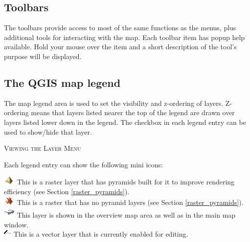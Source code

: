 \subsection{Toolbars}
The toolbars provide access to most of the same functions as the menus, plus
additional tools for interacting with the map. Each toolbar item has popup
help available. Hold your mouse over the item and a short description of the
tool's purpose will be displayed. %

\subsection{The QGIS map legend}
The map legend area is used to set the visibility and z-ordering of layers.
Z-ordering means that layers listed nearer the top of the legend are drawn
over layers listed lower down in the legend. The checkbox in each legend entry
can be used to show/hide that layer.
\begin{Tip} \caption{\textsc{Viewing the Layer Menu}}
\end{Tip}

Each legend entry can show the following mini icons:

\includegraphics[scale=1]{qgis_user_guide_images/pyramid} This is a raster layer that has pyramids built for it to improve rendering efficiency (see Section \ref{raster_pyramids}).\\
\includegraphics[scale=1]{qgis_user_guide_images/no_pyramid} This is a raster that has no pyramid layers (see Section \ref{raster_pyramids}).\\
\includegraphics[scale=1]{qgis_user_guide_images/inoverview} This layer is shown in the overview map area as well as in the main map window.\\
\includegraphics[scale=1]{qgis_user_guide_images/editable} This is a vector layer that is currently enabled for editing.\\

